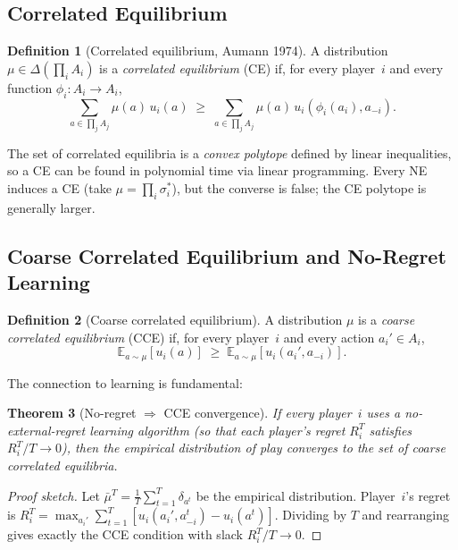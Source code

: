 \documentclass[11pt,a4paper]{article}
\theoremstyle{plain}
\newtheorem{theorem}{Theorem}[section]
\theoremstyle{definition}
\newtheorem{definition}[theorem]{Definition}
\newcommand{\E}{\mathbb{E}}
\begin{document}
\subsection{Correlated Equilibrium}

\begin{definition}[Correlated equilibrium, Aumann 1974]
A distribution $\mu \in \Delta(\prod_i A_i)$ is a \emph{correlated
equilibrium} (CE) if, for every player~$i$ and every function
$\phi_i : A_i \to A_i$,
\[
  \sum_{a \in \prod_j A_j} \mu(a)\, u_i(a)
  \;\geq\;
  \sum_{a \in \prod_j A_j} \mu(a)\, u_i(\phi_i(a_i), a_{-i}).
\]
\end{definition}

The set of correlated equilibria is a \emph{convex polytope} defined by
linear inequalities, so a CE can be found in polynomial time via linear
programming.  Every NE induces a CE (take $\mu = \prod_i \sigma_i^*$),
but the converse is false; the CE polytope is generally larger.

\subsection{Coarse Correlated Equilibrium and No-Regret Learning}

\begin{definition}[Coarse correlated equilibrium]
A distribution $\mu$ is a \emph{coarse correlated equilibrium} (CCE) if,
for every player~$i$ and every action $a_i' \in A_i$,
\[
  \E_{a\sim\mu}[u_i(a)]
  \;\geq\;
  \E_{a\sim\mu}[u_i(a_i', a_{-i})].
\]
\end{definition}

The connection to learning is fundamental:

\begin{theorem}[No-regret $\Rightarrow$ CCE convergence]
\label{thm:no_regret_cce}
If every player~$i$ uses a no-external-regret learning algorithm (so that
each player's regret $R_i^T$ satisfies $R_i^T / T \to 0$), then the
empirical distribution of play converges to the set of coarse correlated
equilibria.
\end{theorem}

\begin{proof}[Proof sketch]
Let $\bar{\mu}^T = \frac{1}{T}\sum_{t=1}^{T} \delta_{a^t}$ be the
empirical distribution.  Player~$i$'s regret is
$R_i^T = \max_{a_i'}\sum_{t=1}^T [u_i(a_i', a_{-i}^t) - u_i(a^t)]$.
Dividing by $T$ and rearranging gives exactly the CCE condition with
slack $R_i^T/T \to 0$.
\end{proof}
\end{document}
